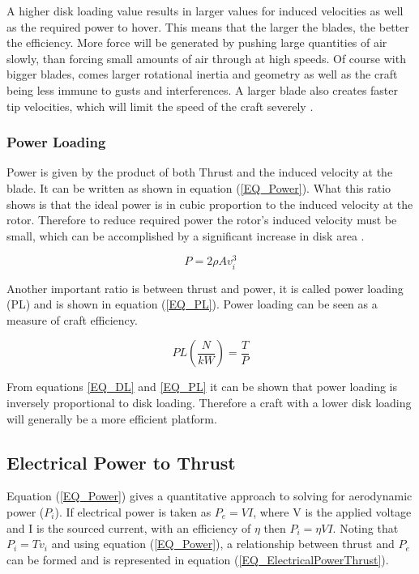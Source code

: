 A higher disk loading value results in larger values for induced velocities as well as the required power to hover. This means that the larger the blades, the better the efficiency. More force will be generated by pushing large quantities of air slowly, than forcing small amounts of air through at high speeds. Of course with bigger blades, comes larger rotational inertia and geometry as well as the craft being less immune to gusts and interferences. A larger blade also creates faster tip velocities, which will limit the speed of the craft severely \cite{Leishman}.



\subsubsection{Power Loading}
Power is given by the product of both Thrust and the induced velocity at the blade. It can be written as shown in equation (\ref{EQ_Power}). What this ratio shows is that the ideal power is in cubic proportion to the induced velocity at the rotor. Therefore to reduce required power the rotor's induced velocity must be small, which can be accomplished by a significant increase in disk area \cite{Leishman}.

\begin{equation}
\label{EQ_Power}
P = 2 \rho A v_{i}^3
\end{equation}

Another important ratio is between thrust and power, it is called power loading (PL) and is shown in equation (\ref{EQ_PL}). Power loading can be seen as a measure of craft efficiency. 

\begin{equation}
\label{EQ_PL}
PL (\frac{N}{kW})= \frac{T}{P}
\end{equation}

From equations \eqref{EQ_DL} and \eqref{EQ_PL} it can be shown that power loading is inversely proportional to disk loading. Therefore a craft with a lower disk loading will generally be a more efficient platform.

\subsection{Electrical Power to Thrust}
Equation (\ref{EQ_Power}) gives a quantitative approach to solving for aerodynamic power ($P_i$). If electrical power is taken as $P_e = VI$, where V is the applied voltage and I is the sourced current, with an efficiency of $\eta$ then $P_i = \eta VI$. Noting that $P_i = T v_i$ and using equation (\ref{EQ_Power}), a relationship between thrust and $P_e$ can be formed and is represented in equation (\ref{EQ_ElectricalPowerThrust}).

